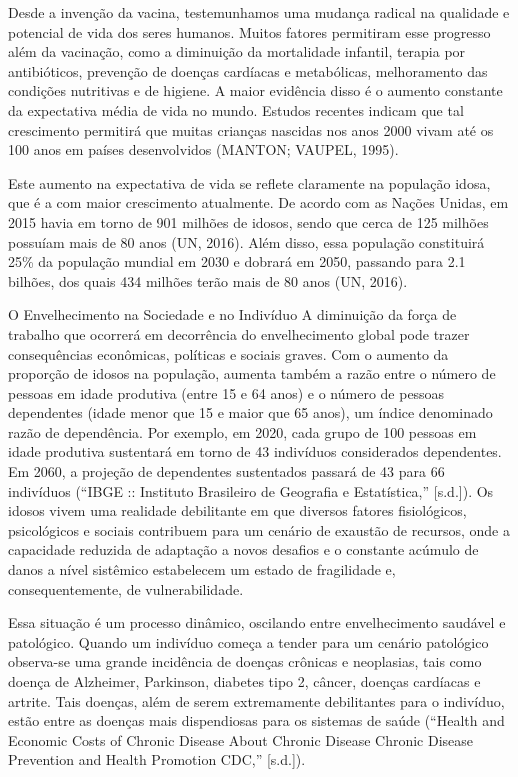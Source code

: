 \documentclass[]{book}
\begin{document}
Desde a invenção da vacina, testemunhamos uma mudança radical na
qualidade e potencial de vida dos seres humanos. Muitos fatores permitiram esse
progresso além da vacinação, como a diminuição da mortalidade infantil, terapia por
antibióticos, prevenção de doenças cardíacas e metabólicas, melhoramento das
condições nutritivas e de higiene. A maior evidência disso é o aumento constante da
expectativa média de vida no mundo. Estudos recentes indicam que tal crescimento
permitirá que muitas crianças nascidas nos anos 2000 vivam até os 100 anos em
países desenvolvidos (MANTON; VAUPEL, 1995).

Este aumento na expectativa de vida se reflete claramente na população idosa,
que é a com maior crescimento atualmente. De acordo com as Nações Unidas, em
2015 havia em torno de 901 milhões de idosos, sendo que cerca de 125 milhões
possuíam mais de 80 anos (UN, 2016). Além disso, essa população constituirá 25\% da população mundial em 2030 e dobrará em 2050, passando para 2.1 bilhões, dos quais
434 milhões terão mais de 80 anos (UN, 2016).

O Envelhecimento na Sociedade e no Indivíduo
A diminuição da força de trabalho que ocorrerá em decorrência do
envelhecimento global pode trazer consequências econômicas, políticas e sociais graves. Com o aumento da proporção de idosos na população, aumenta também a
razão entre o número de pessoas em idade produtiva (entre 15 e 64 anos) e o número
de pessoas dependentes (idade menor que 15 e maior que 65 anos), um índice
denominado razão de dependência. Por exemplo, em 2020, cada grupo de 100
pessoas em idade produtiva sustentará em torno de 43 indivíduos considerados
dependentes. Em 2060, a projeção de dependentes sustentados passará de 43 para 66
indivíduos (``IBGE :: Instituto Brasileiro de Geografia e Estatística,'' {[}s.d.{]}).
Os idosos vivem uma realidade debilitante em que diversos fatores fisiológicos,
psicológicos e sociais contribuem para um cenário de exaustão de recursos, onde a
capacidade reduzida de adaptação a novos desafios e o constante acúmulo de danos a
nível sistêmico estabelecem um estado de fragilidade e, consequentemente, de
vulnerabilidade.

Essa situação é um processo dinâmico, oscilando entre envelhecimento saudável e patológico. Quando um indivíduo começa a tender para um cenário patológico observa-se uma grande incidência de doenças crônicas e neoplasias, tais como doença de Alzheimer, Parkinson, diabetes tipo 2, câncer, doenças cardíacas e artrite. Tais doenças, além de serem extremamente debilitantes para o indivíduo, estão entre as doenças mais dispendiosas para os sistemas de saúde (``Health and Economic Costs of Chronic Disease \textbar{} About Chronic Disease \textbar{} Chronic Disease Prevention and Health Promotion \textbar{} CDC,'' {[}s.d.{]}).
\end{document}
